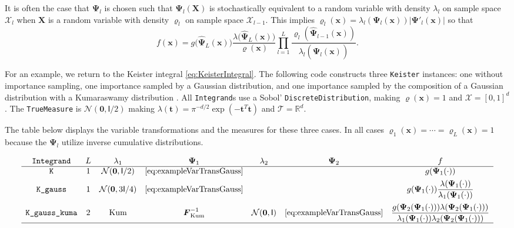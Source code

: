 \documentclass[graybox]{svmult}
\begin{document}
It is often the case that $\boldsymbol{\Psi}_l$ is chosen such that $\boldsymbol{\Psi}_l(\boldsymbol{X})$ is stochastically equivalent to a random variable with density $\lambda_l$ on sample space $\mathcal{X}_l$ when $\boldsymbol{X}$ is a random variable with density $\varrho_l$ on sample space $\mathcal{X}_{l-1}$.  This implies  $\varrho_l(\boldsymbol{x}) = \lambda_l(\boldsymbol{\Psi}_l(\boldsymbol{x}))\lvert  \boldsymbol{\Psi}'_l (\boldsymbol{x}) \rvert$ so that
\begin{equation*}
f(\boldsymbol{x}) 
 = g\bigl(\widehat{\boldsymbol{\Psi}}_L(\boldsymbol{x})\bigr)\frac{\lambda\bigl(\widehat{\boldsymbol{\Psi}}_L(\boldsymbol{x})\bigr)}{\varrho(\boldsymbol{x})}\prod_{l=1}^L \frac{\varrho_l(\widehat{\boldsymbol{\Psi}}_{l-1}(\boldsymbol{x}))}{\lambda_l(\widehat{\boldsymbol{\Psi}}_l(\boldsymbol{x}))} .
\end{equation*}

For an example, we return to the Keister integral \eqref{eq:KeisterIntegral}. The following code constructs three \texttt{Keister} instances: one without importance sampling, one importance sampled by a Gaussian distribution, and one importance sampled by the composition of a Gaussian distribution with a Kumaraswamy distribution \cite{Kumaraswamy}. All \texttt{Integrand}s use a Sobol' \texttt{DiscreteDistribution}, making $\varrho(\boldsymbol{x})=1$ and $\mathcal{X} = [0,1]^d$. The \texttt{TrueMeasure} is $\mathcal{N}(\boldsymbol{0},\mathsf{I}/2)$ making $\lambda(\boldsymbol{t}) = \pi^{-d/2} \exp(-\boldsymbol{t}^T \boldsymbol{t})$ and $\mathcal{T} = \mathbb{R}^d$. 

The table below displays the variable transformations and the measures for these three cases.  In all cases $\varrho_1(\boldsymbol{x}) = \cdots = \varrho_L(\boldsymbol{x}) = 1$ because the $\boldsymbol{\Psi}_l$ utilize inverse cumulative distributions.

\[\begin{array}{ccccccc}
	\texttt{Integrand} & L & \lambda_1 & \boldsymbol{\Psi}_1 & \lambda_2 & \boldsymbol{\Psi}_2 & f \tabularnewline%
	\hline
	\texttt{K} & 1 & \mathcal{N}(\boldsymbol{0}, \mathsf{I}/2) & \eqref{eq:exampleVarTransGauss}& && g(\boldsymbol{\Psi}_1(\cdot)) \tabularnewline [1ex]
	\texttt{K\_gauss} & 1 & \mathcal{N}(\boldsymbol{0},3 \mathsf{I}/4) & \eqref{eq:exampleVarTransGauss} & && 
	\displaystyle g(\boldsymbol{\Psi}_1(\cdot)) \frac{\lambda(\boldsymbol{\Psi}_1(\cdot))}{\lambda_1(\boldsymbol{\Psi}_1(\cdot))} \tabularnewline [2.5ex]
	\texttt{K\_gauss\_kuma} & 2 & \textup{Kum} & \boldsymbol{F}^{-1}_\textup{Kum} & \mathcal{N}(\boldsymbol{0},\mathsf{I}) &  \eqref{eq:exampleVarTransGauss} &
	\displaystyle \frac{g(\boldsymbol{\Psi}_2(\boldsymbol{\Psi}_1(\cdot))) \lambda(\boldsymbol{\Psi}_2(\boldsymbol{\Psi}_1(\cdot))) }{\lambda_1(\boldsymbol{\Psi}_1(\cdot)) \lambda_2(\boldsymbol{\Psi}_2(\boldsymbol{\Psi}_1(\cdot)))} 
   \\ \hline %
\end{array}
\]
\end{document}
